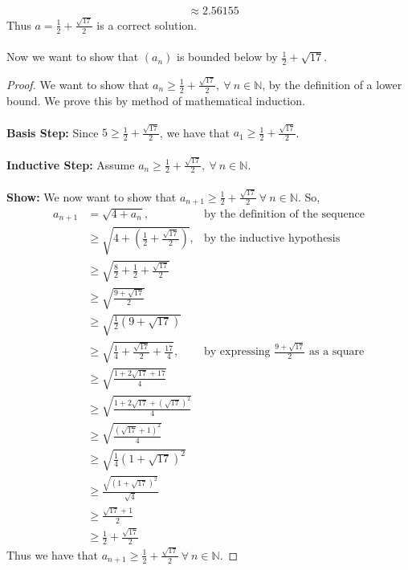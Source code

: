 \documentclass[12pt,letterpaper]{article}
\newcommand{\N}{\mathbb{N}}
\theoremstyle{case}
\theoremstyle{definition}
\begin{document}
\begin{enumerate}
\begin{enumerate}
\begin{align*}
			&\approx 2.56155
		\end{align*}
		Thus $a=\frac{1}{2}+\frac{\sqrt{17}}{2}$ is a correct solution.
		\\\\Now we want to show that $(a_n)$ is bounded below by $\frac{1}{2}+\sqrt{17}$.
		\begin{proof}
			We want to show that $a_n \geq \frac{1}{2}+\frac{\sqrt{17}}{2},\ \forall\ n \in \N$, by the definition of a lower bound. We prove this by method of mathematical induction.
			\\\\\textbf{Basis Step:} Since $5 \geq \frac{1}{2}+\frac{\sqrt{17}}{2}$, we have that $a_1 \geq \frac{1}{2}+\frac{\sqrt{17}}{2}$.
			\\\\\textbf{Inductive Step:} Assume $a_n \geq \frac{1}{2}+\frac{\sqrt{17}}{2},\ \forall\ n \in \N$.
			\\\\\textbf{Show:} We now want to show that $ a_{n+1} \geq \frac{1}{2}+\frac{\sqrt{17}}{2}\ \forall\ n \in \N$. So,
			\begin{align*}
				a_{n+1} &= \sqrt{4+a_n}, &\text{by the definition of the sequence} \\
				&\geq \sqrt{4+\left(\frac{1}{2}+\frac{\sqrt{17}}{2}\right)}, &\text{by the inductive hypothesis} \\
				&\geq \sqrt{\frac{8}{2}+\frac{1}{2}+\frac{\sqrt{17}}{2}} \\
				&\geq \sqrt{\frac{9+\sqrt{17}}{2}} \\
				&\geq \sqrt{\frac{1}{2}\left(9+\sqrt{17}\right)} \\
				&\geq \sqrt{\frac{1}{4}+\frac{\sqrt{17}}{2}+\frac{17}{4}}, &\text{by expressing } \frac{9+\sqrt{17}}{2} \text{ as a square} \\
				&\geq \sqrt{\frac{1+2\sqrt{17}+17}{4}} \\
				&\geq \sqrt{\frac{1+2\sqrt{17}+(\sqrt{17})^2}{4}} \\
				&\geq \sqrt{\frac{(\sqrt{17}+1)^2}{4}} \\
				&\geq \sqrt{\frac{1}{4}\left(1+\sqrt{17}\right)^2} \\
				&\geq \frac{\sqrt{(1+\sqrt{17})^2}}{\sqrt{4}} \\
				&\geq \frac{\sqrt{17}+1}{2} \\
				&\geq \frac{1}{2} + \frac{\sqrt{17}}{2}
			\end{align*}
			Thus we have that $ a_{n+1} \geq \frac{1}{2} + \frac{\sqrt{17}}{2}\ \forall\ n \in \N$.

\end{proof}
\end{enumerate}
\end{enumerate}
\end{document}
